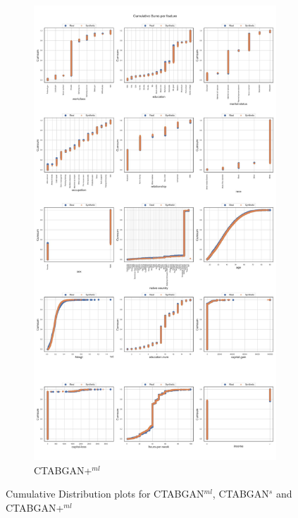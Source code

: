 \begin{landscape}
\begin{figure}[h]
\begin{subfigure}{0.3\linewidth}
			\includegraphics[height=\textheight,width=\linewidth,keepaspectratio]{images/cumsums/ctabgan+.jpg}
			\caption{CTABGAN+$^{ml}$}
		\end{subfigure}
		\hfill
		\caption{Cumulative Distribution plots for CTABGAN$^{ml}$, CTABGAN$^s$ and CTABGAN+$^{ml}$}
		\label{fig_a:cumsum_1}
	\end{figure}
\end{landscape}
